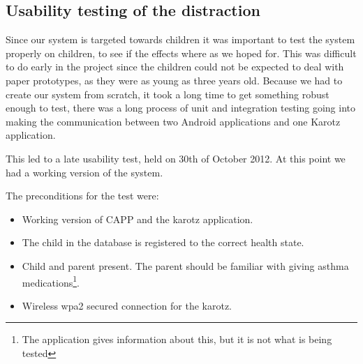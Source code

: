 \subsection{Usability testing of the distraction}
\label{sec:usabilitytestonchildren}
Since our system is targeted towards children it was important to test the system properly on children, to see if the effects where as we hoped for. This was difficult to do early in the project since the children could not be expected to deal with paper prototypes, as they were as young as three years old. Because we had to create our system from scratch, it took a long time to get something robust enough to test, there was a long process of unit and integration testing going into making the communication between two Android applications and one Karotz application.

This led to a late usability test, held on 30th of October 2012. At this point we had a working version of the system. 

The preconditions for the test were:
\begin{itemize}
	\item Working version of CAPP and the karotz application.
	\item The child in the database is registered to the correct health state.
	\item Child and parent present. The parent should be familiar with giving asthma medications\footnote{The application gives information about this, but it is not what is being tested}.
	\item Wireless wpa2 secured connection for the karotz.
\end{itemize}

